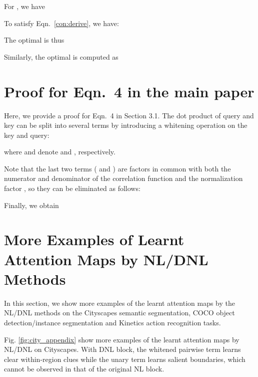 \documentclass[runningheads]{llncs}
\begin{document}
For , we have
\begin{small}

\end{small}
To satisfy Eqn.~\ref{con:derive}, we have:
\begin{small}

\end{small}
The optimal  is thus
\begin{small}

\end{small}Similarly, the optimal  is computed as
\begin{small}

\end{small}

\section{Proof for Eqn.~4 in the main paper}
Here, we provide a proof for Eqn.~4 in Section 3.1. The dot product of query  and key  can be split into several terms by introducing a whitening operation on the key and query:
\begin{small}

\end{small}where  and  denote  and , respectively.

Note that the last two terms ( and ) are factors in common with both the numerator and denominator of the correlation function  and the normalization factor , so they can be eliminated as follows:

\begin{small}

\end{small}

Finally, we obtain
\begin{small}

\end{small}

\section{More Examples of Learnt Attention Maps by NL/DNL Methods}

In this section, we show more examples of the learnt attention maps by the NL/DNL methods on the Cityscapes semantic segmentation, COCO object detection/instance segmentation and Kinetics action recognition tasks.

Fig. \ref{fig:city_appendix} show more examples of the learnt attention maps by NL/DNL on Cityscapes. With DNL block, the whitened pairwise term learns clear within-region clues while the unary term learns salient boundaries, which cannot be observed in that of the original NL block.
\end{document}
